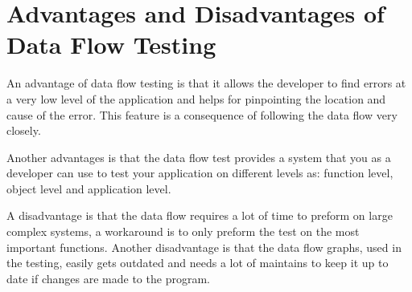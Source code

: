 \section{Advantages and Disadvantages of Data Flow Testing}
An advantage of data flow testing is that it allows the developer to find errors at a very low level of the application and helps for pinpointing the location and cause of the error. This feature is a consequence of following the data flow very closely.

Another advantages is that the data flow test provides a system that you as a developer can use to test your application on different levels as: function level, object level and application level.

A disadvantage is that the data flow requires a lot of time to preform on large complex systems, a workaround is to only preform the test on the most important functions. Another disadvantage is that the data flow graphs, used in the testing, easily gets outdated and needs a lot of maintains to keep it up to date if changes are made to the program.